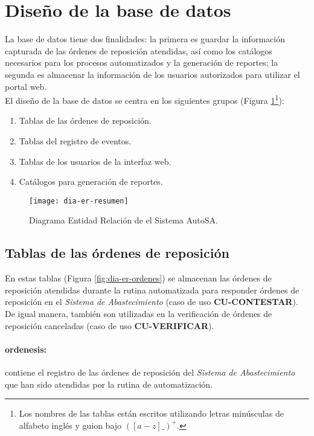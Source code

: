 \section{Diseño de la base de datos}
La base de datos tiene dos finalidades: la primera es guardar la información capturada de las órdenes de reposición atendidas, así como los catálogos necesarios para los procesos automatizados y la generación de reportes; la segunda es almacenar la información de los usuarios autorizados para utilizar el portal web.\\
El diseño de la base de datos se centra en los siguientes grupos (Figura \ref{fig:dia-er-resumen}\footnote{Los nombres de las tablas están escritos utilizando letras minúsculas de alfabeto inglés y guion bajo $([a-z]{\_})^+$.}):
\begin{enumerate}
	\item Tablas de las órdenes de reposición.
	\item Tablas del registro de eventos.
	\item Tablas de los usuarios de la interfaz web.
	\item Catálogos para generación de reportes.
\end{enumerate}
\begin{figure}[h]
  \centering
  \texttt{[image: dia-er-resumen]}
  \caption{Diagrama Entidad Relación de el Sistema AutoSA.}
  \label{fig:dia-er-resumen}
\end{figure}
\pagebreak
\subsection{Tablas de las órdenes de reposición}
En estas tablas (Figura \ref{fig:dia-er-ordenes}) se almacenan las órdenes de reposición atendidas durante la rutina automatizada para responder órdenes de reposición en el \textit{Sistema de Abastecimiento} (caso de uso \textbf{CU-CONTESTAR}). De igual manera, también son utilizadas en la verificación de órdenes de reposición canceladas (caso de uso \textbf{CU-VERIFICAR}).
\paragraph{ordenes{\textunderscore}is:} contiene el registro de las órdenes de reposición del \textit{Sistema de Abastecimiento} que han sido atendidas por la rutina de automatización.
